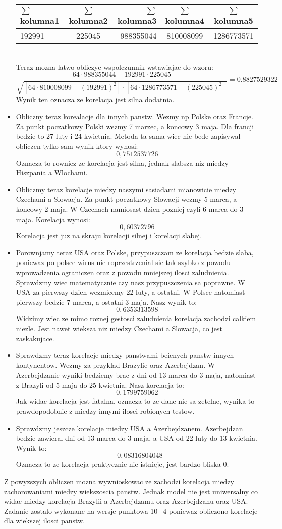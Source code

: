 \documentclass[12pt]{article}
\begin{document}
\begin{itemize}
\begin{tabular}{|l|c|r|c|c|} \hline
$\sum$ kolumna1 & $\sum$ kolumna2 & $\sum$ kolumna3 & $\sum$ kolumna4 & $\sum$ kolumna5  \\
\hline
192991 & 225045 & 988355044 & 810008099 & 1286773571\\
\hline
\end{tabular}\\
Teraz mozna latwo obliczyc wspolczunnik wstawiajac do wzoru:
$$\frac{64 \cdot 988355044 - 192991 \cdot 225045}{\sqrt{[64 \cdot 810008099 - (192991)^{2}]\cdot [64 \cdot 1286773571 - (225045)^{2}]}} =  0.8827529322$$
Wynik ten oznacza ze korelacja jest silna dodatnia.
\item
Obliczny teraz korealacje dla innych panstw. Wezmy np Polske oraz Francje. Za punkt poczatkowy Polski wezmy 7 marzec, a koncowy 3 maja. Dla francji bedzie to 27 luty i 24 kwietnia. Metoda ta sama wiec nie bede zapisywal obliczen tylko sam wynik ktory wynosi:
$$0,7512537726$$
Oznacza to rowniez ze korelacja jest silna, jednak slabsza niz miedzy Hiszpania a Wlochami.
\item
Obliczmy teraz korelacje miedzy naszymi sasiadami mianowicie miedzy Czechami a Slowacja. Za punkt poczatkowy Slowacji wezmy 5 marca, a koncowy 2 maja. W Czechach namiosast dzien pozniej czyli 6 marca do 3 maja. Korelacja wynosi:
$$0,60372796$$
Korelacja jest juz na skraju korelacji silnej i korelacji slabej.
\item
Porownjamy teraz USA oraz Polske, przypuszczam ze korelacja bedzie slaba, poniewaz po polsce wirus nie roprzestrzenial sie tak szybko z powodu wprowadzenia ograniczen oraz z powodu mniejszej ilosci zaludnienia. Sprawdzmy wiec matematycznie czy nasz przypuszczenia sa poprawne. W USA za pierwszy dzien wezmieemy 22 luty, a ostatni. W Polsce natomiast pierwszy bedzie 7 marca, a ostatni 3 maja. Nasz wynik to:
$$0,6353313598$$
Widzimy wiec ze mimo roznej gestosci zaludnienia korelacja zachodzi calkiem niezle. Jest nawet wieksza niz miedzy Czechami a Slowacja, co jest zaskakujace.
\item
Sprawdzmy teraz korelacje miedzy panstwami beienych panstw innych kontynentow. Wezmy za przyklad Brazylie oraz Azerbejdzan. W Azerbejdzanie wyniki bedziemy brac z dni od 13 marca do 3 maja, natomiast z Brazyli od 5 maja do 25 kwietnia. Nasz korelacja to:
$$0,1799759062$$
Jak widac korelacja jest fatalna, oznacza to ze dane nie sa zetelne, wynika to prawdopodobnie z miedzy innymi ilosci robionych testow.\\
\item
Sprawdzmy jeszcze korelacje miedzy USA a Azerbejdzanem. Azerbejdzan bedzie zawieral dni od 13 marca do 3 maja, a USA od 22 luty do 13 kwietnia. Wynik to:
$$-0,08316804048$$
Oznacza to ze korelacja praktycznie nie istnieje, jest bardzo bliska 0.
\end{itemize}
Z powyzszych obliczen mozna wywnioskowac ze zachodzi korelacja miedzy zachorowaniami miedzy wiekszoscia panstw. Jednak model nie jest uniwersalny co widac miedzy korelacja  Brazylii a Azerbejdzamu oraz Azerbejdzanu oraz USA. \\
Zadanie zostalo wykonane na wersje punktowa 10+4 poniewaz obliczono korelacje dla wiekszej ilosci panstw.
\end{document}
